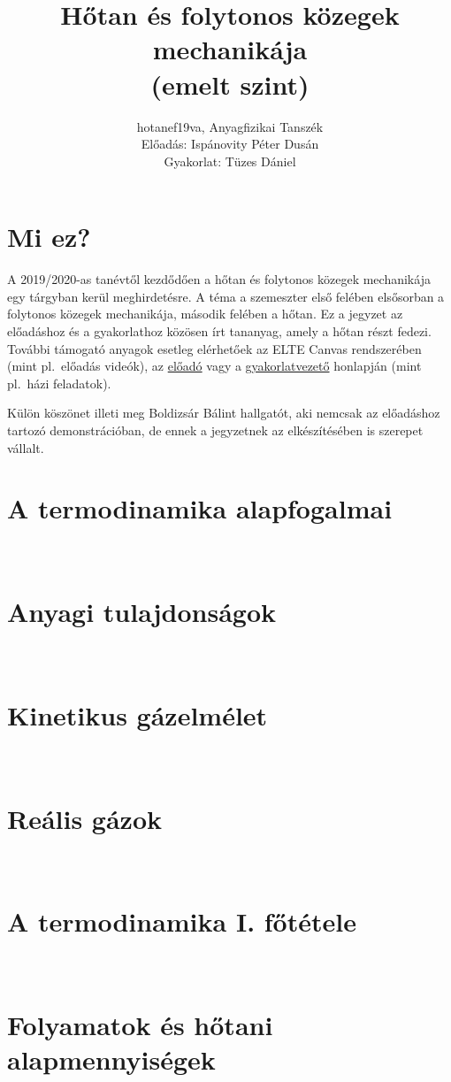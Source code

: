 \documentclass[12pt,a4paper]{scrartcl}
\begin{document}
\title{Hőtan és folytonos közegek mechanikája\\(emelt szint)}
\author{hotanef19va, Anyagfizikai Tanszék\\
Előadás: Ispánovity Péter Dusán\\
Gyakorlat: Tüzes Dániel}
\maketitle
\tableofcontents
\section*{Mi ez?}
A 2019/2020-as tanévtől kezdődően a hőtan és folytonos közegek mechanikája egy tárgyban kerül meghirdetésre. A téma a szemeszter első felében elsősorban a folytonos közegek mechanikája, második felében a hőtan. Ez a jegyzet az előadáshoz és a gyakorlathoz közösen írt tananyag, amely a hőtan részt fedezi. További támogató anyagok esetleg elérhetőek az ELTE Canvas rendszerében (mint pl.\ előadás videók), az
\href{http://ispanovity.web.elte.hu/teaching/}{előadó} vagy a  \href{http://metal.elte.hu/~tuzes/oktatas/#folytkoz_19_20}{gyakorlatvezető} honlapján (mint pl.\ házi feladatok).

Külön köszönet illeti meg Boldizsár Bálint hallgatót, aki nemcsak az előadáshoz tartozó demonstrációban, de ennek a jegyzetnek az elkészítésében is szerepet vállalt.

\section{A termodinamika alapfogalmai}
~
\section{Anyagi tulajdonságok}
~
\section{Kinetikus gázelmélet}
~
\section{Reális gázok}
~
\section{A termodinamika I. főtétele}
~
\section{Folyamatok és hőtani alapmennyiségek}
~
\end{document}
